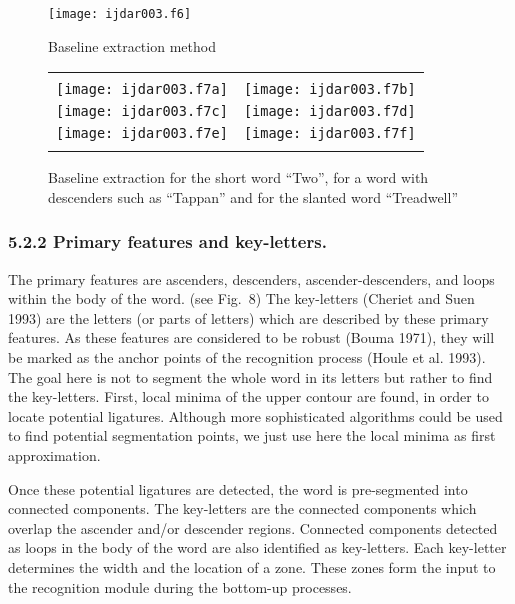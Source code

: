 \documentclass[ijdar]{svjour}
\begin{document}
\begin{figure}%
\texttt{[image: ijdar003.f6]}%
\caption{Baseline extraction method}
\label{FIGBASELEXT}
\end{figure}
%
\begin{figure}%
\begin{tabular}{|l c|}
\hline
&\\
\texttt{[image: ijdar003.f7a]}%
&\texttt{[image: ijdar003.f7b]}%
\\
\texttt{[image: ijdar003.f7c]}%
&\texttt{[image: ijdar003.f7d]}%
\\
\texttt{[image: ijdar003.f7e]}%
&\texttt{[image: ijdar003.f7f]}%
\\
&\\
\hline
\end{tabular}
\caption{Baseline extraction for the short word ``Two'', for a word with
descenders such as ``Tappan'' and for the slanted word ``Treadwell''}
\label{BASEL}
\end{figure}

\subsubsection{5.2.2 Primary features and key-letters.}
\label{SECPRIME}

The primary features are ascenders, descenders,
ascender-descenders,\break
and loops within the body of the word. (see Fig.~8)
The key-letters (Cheriet and Suen 1993) are the letters (or parts of letters) which are described by these primary features.
As these features are considered to be robust (Bouma 1971), they will be marked as the anchor points of the recognition process (Houle et al. 1993).
The goal here is not to segment the whole word in its letters but rather to find the key-letters.
First, local minima of the upper contour are found, in order to locate potential ligatures.
Although more sophisticated algorithms could be used to find potential segmentation points, we just use here the local minima as first approximation.

Once these potential ligatures are detected, the word is pre-segmented into connected components.
The key-letters are the connected components which overlap the ascender and/or descender regions.
Connected components detected as loops in the body of the word are also identified as key-letters.
Each key-letter determines the width and the location of a zone.
These zones form the input to the recognition module during the bottom-up processes.
\end{document}
